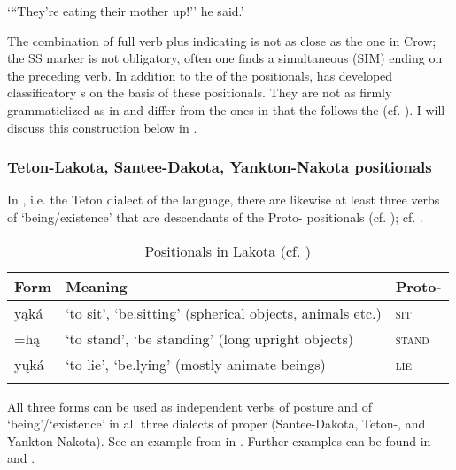 \documentclass[output=paper]{langsci/langscibook}
\begin{document}
`{``}They're eating their mother up!'' he said.' \citep[69]{Mixco1997}
\z


The combination of full verb plus  indicating  is not as close as the one in Crow; the SS marker is not obligatory, often one finds a simultaneous (SIM) ending on the preceding verb.
In addition to the  of the positionals,  has developed classificatory s on the basis of these positionals. They are not as firmly grammaticlized as in  and differ from the  ones in that the  follows the  (cf. \citealt[42]{Mixco1997}). I will discuss this construction below in .  

\subsubsection{Teton-Lakota, Santee-Dakota, Yankton-Nakota positionals}\label{sec:2.2.3}

In , i.e. the Teton dialect of the  language, there are likewise at least three verbs of `being/existence' that are descendants of the Proto- positionals (cf. \citealt[126f]{BoasDeloria1941}); cf. .

\begin{table}
\begin{tabularx}{\textwidth}{lQl}
\lsptoprule
Form & Meaning & Proto-\\
\midrule
{yąká} & `to sit', `be.sitting' (spherical objects, animals etc.) & \scshape sit\\
{=hą} & `to stand', `be standing' (long upright objects) & \scshape stand\\
{y\k{u}ká} & `to lie', `be.lying' (mostly animate beings) & \scshape lie\\
\lspbottomrule
\end{tabularx}
\caption{Positionals in Lakota (cf.   \citealt[126]{BoasDeloria1941})}
\label{tab:helmbrecht:8}
\end{table}

All three forms can be used as independent verbs of posture and of `being'\slash`existence' in all three dialects of  proper (Santee-Dakota, Teton-, and Yankton-Nakota). See an example from  in .\textbf{} Further examples can be found in \citet{Rankin2004a} and \citet{Barron1982}.
\end{document}
